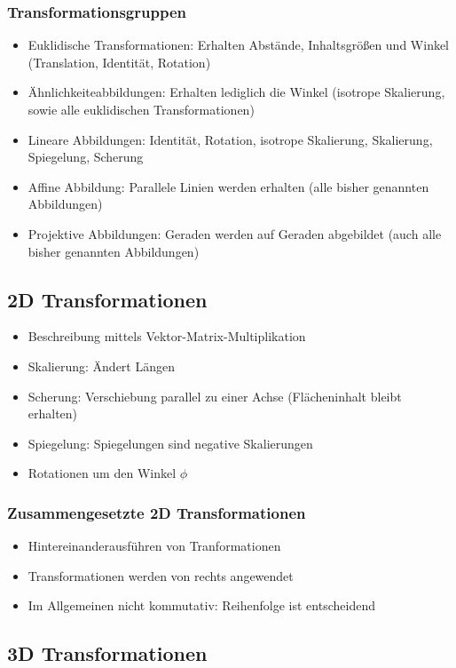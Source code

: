 \subsubsection{Transformationsgruppen}
\begin{itemize}
	\item Euklidische Transformationen: Erhalten Abstände, Inhaltsgrößen und Winkel (Translation, Identität, Rotation)
	\item Ähnlichkeiteabbildungen: Erhalten lediglich die Winkel (isotrope Skalierung, sowie alle euklidischen Transformationen)
	\item Lineare Abbildungen: Identität, Rotation, isotrope Skalierung, Skalierung, Spiegelung, Scherung
	\item Affine Abbildung: Parallele Linien werden erhalten (alle bisher genannten Abbildungen)
	\item Projektive Abbildungen: Geraden werden auf Geraden abgebildet (auch alle bisher genannten Abbildungen)
\end{itemize}


\subsection{2D Transformationen}
\begin{itemize}
	\item Beschreibung mittels Vektor-Matrix-Multiplikation
	\item Skalierung: Ändert Längen
	\item Scherung: Verschiebung parallel zu einer Achse (Flächeninhalt bleibt erhalten)
	\item Spiegelung: Spiegelungen sind negative Skalierungen
	\item Rotationen um den Winkel \(\phi\)
\end{itemize}

\subsubsection{Zusammengesetzte 2D Transformationen}
\begin{itemize}
	\item Hintereinanderausführen von Tranformationen
	\item Transformationen werden von rechts angewendet
	\item Im Allgemeinen nicht kommutativ: Reihenfolge ist entscheidend
\end{itemize}


\subsection{3D Transformationen}

